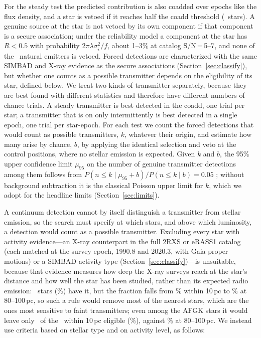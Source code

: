 \documentclass[linenumbers]{aastex702}
\begin{document}
For the steady test the predicted contribution is also coadded over epochs like the flux density, and a star is vetoed if it reaches half the coadd threshold (\NCoaddVeto\ stars). A genuine source at the star is not vetoed by its own component if that component is a secure association; under the reliability model a component at the star has $R<0.5$ with probability $2\pi\lambda\sigma_i^2/f$, about 1--3\% at catalog S/N\,=\,5--7, and none of the \NNatural\ natural emitters is vetoed. Forced detections are characterized with the same SIMBAD and X-ray evidence as the secure associations (Section~\ref{sec:classify}), but whether one counts as a possible transmitter depends on the eligibility of its star, defined below. We treat two kinds of transmitter separately, because they are best found with different statistics and therefore have different numbers of chance trials. A steady transmitter is best detected in the coadd, one trial per star; a transmitter that is on only intermittently is best detected in a single epoch, one trial per star-epoch. For each test we count the forced detections that would count as possible transmitters, $k$, whatever their origin, and estimate how many arise by chance, $b$, by applying the identical selection and veto at the control positions, where no stellar emission is expected. Given $k$ and $b$, the 95\% upper confidence limit $\mu_{95}$ on the number of genuine transmitter detections among them follows from $P(n\le k\mid\mu_{95}+b)/P(n\le k\mid b)=0.05$ \citep{Zech1989}; without background subtraction it is the classical Poisson upper limit for $k$, which we adopt for the headline limits (Section~\ref{sec:limits}).

A continuum detection cannot by itself distinguish a transmitter from stellar emission, so the search must specify at which stars, and above which luminosity, a detection would count as a possible transmitter. Excluding every star with activity evidence---an X-ray counterpart in the full 2RXS or eRASS1 catalog (each matched at the survey epoch, 1990.8 and 2020.3, with Gaia proper motions) or a SIMBAD activity type (Section~\ref{sec:classify})---is unsuitable, because that evidence measures how deep the X-ray surveys reach at the star's distance and how well the star has been studied, rather than its expected radio emission: \NActive\ stars (\PctActive\%) have it, but the fraction falls from \PctActTen\% within 10\,pc to \PctActHundred\% at 80--100\,pc, so such a rule would remove most of the nearest stars, which are the ones most sensitive to faint transmitters; even among the AFGK stars it would leave only \NOldEligAFGKTen\ of the \NAFGKTen\ within 10\,pc eligible (\PctOldEligAFGKTen\%), against \PctOldEligAFGKHundred\% at 80--100\,pc. We instead use criteria based on stellar type and on activity level, as follows:
\end{document}

